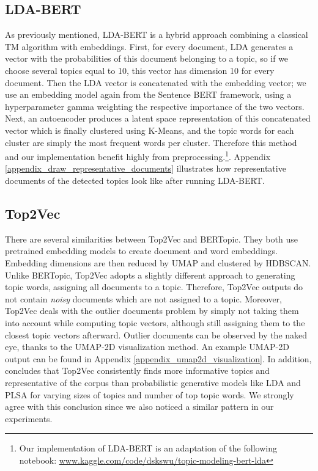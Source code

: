 \documentclass[11pt]{article}
\begin{document}
\subsection{LDA-BERT}
As previously mentioned, LDA-BERT is a hybrid approach combining a classical TM algorithm with embeddings. First, for every document, LDA generates a vector with the probabilities of this document belonging to a topic, so if we choose several topics equal to 10, this vector has dimension 10 for every document. Then the LDA vector is concatenated with the embedding vector; we use an embedding model again from the Sentence BERT framework, using a hyperparameter gamma weighting the respective importance of the two vectors. Next, an autoencoder produces a latent space representation of this concatenated vector which is finally clustered using K-Means, and the topic words for each cluster are simply the most frequent words per cluster. Therefore this method and our implementation benefit highly from preprocessing.\footnote{Our implementation of LDA-BERT is an adaptation of the following notebook: \url{www.kaggle.com/code/dskswu/topic-modeling-bert-lda}}. Appendix \ref{appendix_draw_representative_documents} illustrates how representative documents of the detected topics look like after running LDA-BERT.

\subsection{Top2Vec}
There are several similarities between Top2Vec and BERTopic. They both use pretrained embedding models to create document and word embeddings. Embedding dimensions are then reduced by UMAP and clustered by HDBSCAN. Unlike BERTopic, Top2Vec adopts a slightly different approach to generating topic words, assigning all documents to a topic. Therefore, Top2Vec outputs do not contain \emph{noisy} documents which are not assigned to a topic. Moreover, Top2Vec deals with the outlier documents problem by simply not taking them into account while computing topic vectors, although still assigning them to the closest topic vectors afterward. Outlier documents can be observed by the naked eye, thanks to the UMAP-2D visualization method. An example UMAP-2D output can be found in Appendix \ref{appendix_umap2d_visualization}. In addition, \citet{top2vec} concludes that Top2Vec consistently finds more informative topics and representative of the corpus than probabilistic generative models like LDA and PLSA for varying sizes of topics and number of top topic words. We strongly agree with this conclusion since we also noticed a similar pattern in our experiments.
\end{document}
